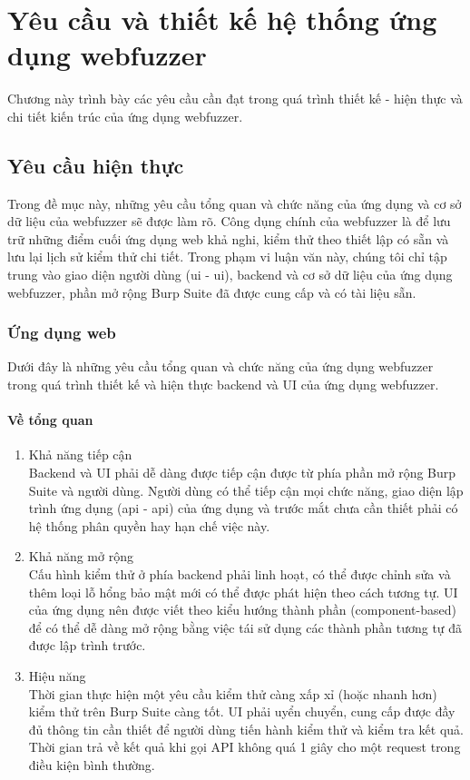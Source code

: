 \chapter{Yêu cầu và thiết kế hệ thống ứng dụng webfuzzer}
Chương này trình bày các yêu cầu cần đạt trong quá trình thiết kế - hiện thực và chi tiết kiến trúc của ứng dụng webfuzzer.
\section{Yêu cầu hiện thực}
Trong đề mục này, những yêu cầu tổng quan và chức năng của ứng dụng và cơ sở dữ liệu của webfuzzer sẽ được làm rõ. Công dụng chính của webfuzzer là để lưu trữ những điểm cuối ứng dụng web khả nghi, kiểm thử theo thiết lập có sẵn và lưu lại lịch sử kiểm thử chi tiết. Trong phạm vi luận văn này, chúng tôi chỉ tập trung vào giao diện người dùng (\acrlong{ui} - \acrshort{ui}), backend và cơ sở dữ liệu của ứng dụng webfuzzer, phần mở rộng Burp Suite đã được cung cấp và có tài liệu sẵn.
\subsection{Ứng dụng web}
Dưới đây là những yêu cầu tổng quan và chức năng của ứng dụng webfuzzer trong quá trình thiết kế và hiện thực backend và UI của ứng dụng webfuzzer.
\subsubsection{Về tổng quan}
\begin{enumerate}
    \item Khả năng tiếp cận\\
    Backend và UI phải dễ dàng được tiếp cận được từ phía phần mở rộng Burp Suite và người dùng. Người dùng có thể tiếp cận mọi chức năng, giao diện lập trình ứng dụng (\acrlong{api} - \acrshort{api}) của ứng dụng và trước mắt chưa cần thiết phải có hệ thống phân quyền hay hạn chế việc này.
    \item Khả năng mở rộng\\
    Cấu hình kiểm thử ở phía backend phải linh hoạt, có thể được chỉnh sửa và thêm loại lỗ hổng bảo mật mới có thể được phát hiện theo cách tương tự. UI của ứng dụng nên được viết theo kiểu hướng thành phần (component-based) để có thể dễ dàng mở rộng bằng việc tái sử dụng các thành phần tương tự đã được lập trình trước.
    \item Hiệu năng\\
    Thời gian thực hiện một yêu cầu kiểm thử càng xấp xỉ (hoặc nhanh hơn) kiểm thử trên Burp Suite càng tốt. UI phải uyển chuyển, cung cấp được đầy đủ thông tin cần thiết để người dùng tiến hành kiểm thử và kiểm tra kết quả. Thời gian trả về kết quả khi gọi API không quá 1 giây cho một request trong điều kiện bình thường.
\end{enumerate}
